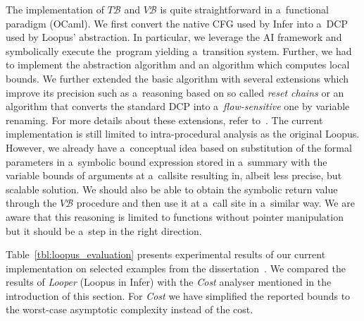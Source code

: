 \documentclass{ExcelAtFIT}
\begin{document}
The implementation of $T\mathcal{B}$ and
$V\mathcal{B}$ is quite straightforward in
a~functional paradigm (OCaml). We first convert
the native CFG used by Infer into a~DCP used
by Loopus' abstraction. In particular, we
leverage the AI framework and symbolically
execute the~program yielding a~transition system.
Further, we had to implement the abstraction
algorithm and an algorithm which computes local
bounds. We further extended the basic algorithm
with several extensions which improve its precision
such as a~reasoning based on so called
\textit{reset chains} or an algorithm that converts
the standard DCP into a~\textit{flow-sensitive} one
by variable renaming. For more details about these
extensions, refer to~\cite{loopus-tool}. The current
implementation is still limited to intra-procedural
analysis as the original Loopus. However, we already
have a~conceptual idea based on substitution of the
formal parameters in a~symbolic bound expression stored
in a~summary with the variable bounds of arguments at
a~callsite resulting in, albeit less precise, but
scalable solution. We should also be able to obtain
the symbolic return value through the $V\mathcal{B}$
procedure and then use it at a~call site in a~similar
way. We are aware that this reasoning is limited to
functions without pointer manipulation but it should
be a~step in the right direction.

Table~\ref{tbl:loopus_evaluation} presents experimental
results of our current implementation on selected
examples from the dissertation~\cite{loopus-tool}.
We compared the results of \textit{Looper}
(Loopus in Infer) with the \textit{Cost} analyser
mentioned in the introduction of this section.
For \textit{Cost} we have simplified the reported
bounds to the worst-case asymptotic complexity
instead of the cost.
\end{document}
